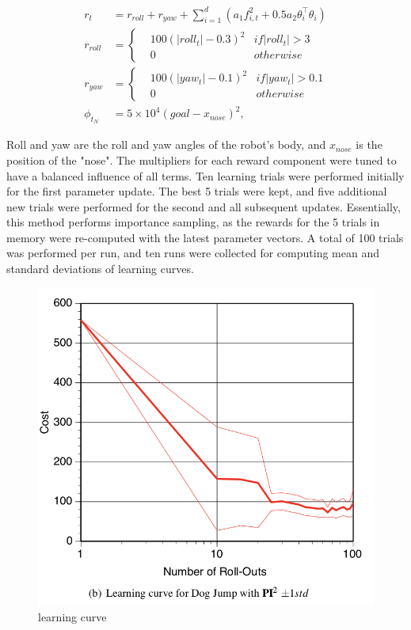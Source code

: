 \documentclass[journal]{IEEEtran}
\begin{document}
\begin{equation} 
  \begin{aligned}
    r_t &= r_{roll}+ r_{yaw} + \sum_{i=1}^{d}(a_1 f_{i,t}^2 + 0.5a_2 \theta_i^{\top}\theta_i) \\
  r_{roll} &= \left\{ \begin{array}{rcl} &100(|roll_t|-0.3)^2 & if |roll_t|>3 \\ &0 &otherwise \end{array} \right. \nonumber \\ 
  r_{yaw} &= \left\{ \begin{array}{rcl} &100(|yaw_t|-0.1)^2 & if |yaw_t|>0.1 \\ &0 &otherwise \end{array} \right. \nonumber \\
    \phi_{t_N}& = 5 \times 10^{4} (goal -x_{nose})^2,   
  \end{aligned}
\end{equation}


Roll and yaw are the roll and yaw angles of the robot's body, and $x_{nose}$ is the position of the "nose".
The multipliers for each reward component were tuned to have a balanced influence of all terms. Ten learning trials were performed initially for the first parameter update.
 The best 5 trials were kept, and five additional new trials were performed for the second and all subsequent updates. 
Essentially, this method performs importance sampling, as the rewards for the 5 trials in memory were re-computed with the latest parameter vectors. 
A total of 100 trials was performed per run, and ten runs were collected for computing mean and standard deviations of learning curves.

\begin{figure}[htbp]
  \includegraphics[width = .5\textwidth]{dog}
  \caption{learning curve}
  \label{dog}
\end{figure}
\end{document}

